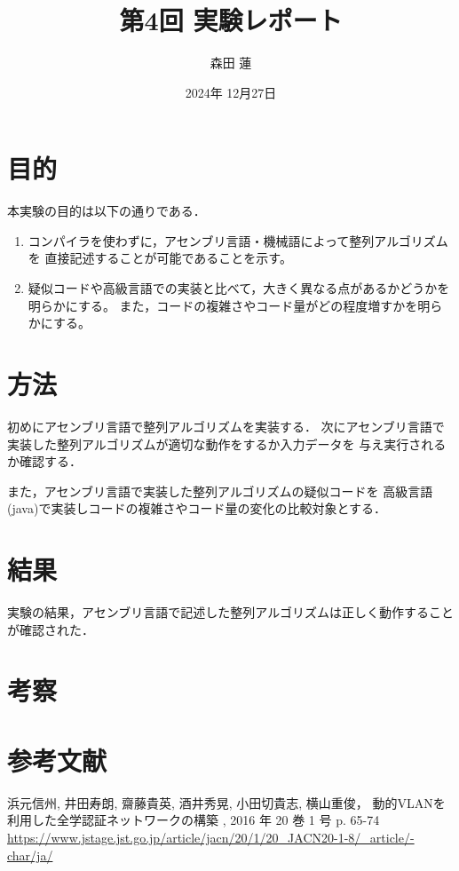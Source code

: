 \documentclass{jlreq}
\title{第4回 実験レポート}
\author{森田 蓮}
\date{2024年 12月27日}
\begin{document}
\maketitle

\section{目的}
本実験の目的は以下の通りである．
\begin{enumerate}
    \item コンパイラを使わずに，アセンブリ言語・機械語によって整列アルゴリズムを
    直接記述することが可能であることを示す。
    \item 疑似コードや高級言語での実装と比べて，大きく異なる点があるかどうかを明らかにする。
    また，コードの複雑さやコード量がどの程度増すかを明らかにする。
\end{enumerate}


\section{方法}
初めにアセンブリ言語で整列アルゴリズムを実装する．
次にアセンブリ言語で実装した整列アルゴリズムが適切な動作をするか入力データを
与え実行されるか確認する．

また，アセンブリ言語で実装した整列アルゴリズムの疑似コードを
高級言語(java)で実装しコードの複雑さやコード量の変化の比較対象とする．
  

\section{結果}
実験の結果，アセンブリ言語で記述した整列アルゴリズムは正しく動作することが確認された．


\section{考察}



\section*{参考文献}
浜元信州, 井田寿朗, 齋藤貴英, 酒井秀晃, 小田切貴志, 横山重俊，
動的VLANを利用した全学認証ネットワークの構築  
, 2016 年 20 巻 1 号 p. 65-74  
\url{https://www.jstage.jst.go.jp/article/jacn/20/1/20_JACN20-1-8/_article/-char/ja/}
\end{document}
